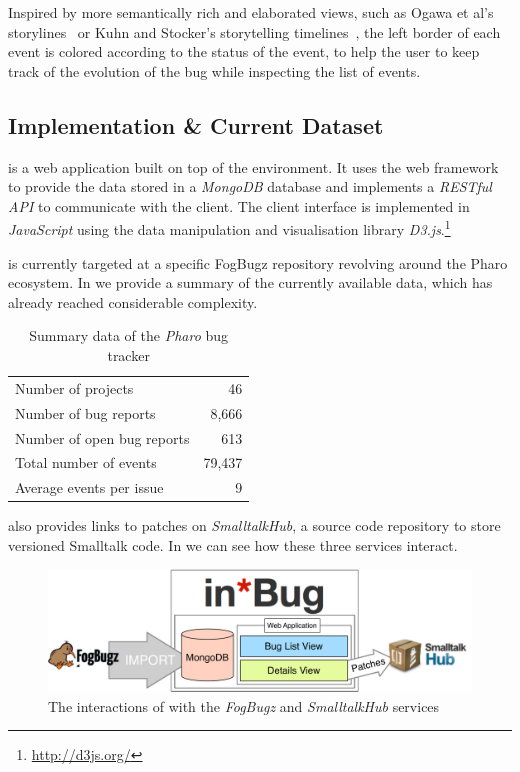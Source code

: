 \indent{}Inspired by more semantically rich and elaborated views, such as Ogawa et al's storylines~\cite{Ogaw2010a} or Kuhn and Stocker's storytelling timelines~\cite{Kuhn2012a}, the left border of each event is colored according to the status of the event, to help the user to keep track of the evolution of the bug while inspecting the list of events.

\subsection{Implementation \& Current Dataset}

\ib is a web application built on top of the \pha environment.
It uses the \sea web framework~\cite{Duca2010a} to provide the data stored in a \textit{MongoDB} database and implements a \textit{RESTful API} to communicate with the client.
The client interface is implemented in \textit{JavaScript} using the data manipulation and visualisation library \textit{D3.js}.\footnote{\url{http://d3js.org/}}

\ib is currently targeted at a specific FogBugz repository revolving around the Pharo ecosystem.
In  we provide a summary of the currently available data, which has already reached considerable complexity.

\begin{table}[ht]
\center
\caption{Summary data of the \textit{Pharo} bug tracker}
\label{tab-tracker-summary}
\begin{tabular}{p{7cm} r} \hline
Number of projects & 46 \\
Number of bug reports & 8,666 \\
Number of open bug reports & 613 \\
Total number of events & 79,437 \\
Average events per issue & 9 \\ \hline
\end{tabular}
\end{table}

\ib also provides links to patches on \emph{SmalltalkHub}, a source code repository to store versioned Smalltalk code.
In  we can see how these three services interact.

\begin{figure}[ht]
\includegraphics[width=\linewidth]{Images/visualize/inbug-ecosystem.pdf}
\caption{The interactions of \ib with the \emph{FogBugz} and \emph{SmalltalkHub} services}
\label{fig-inbug-ecosystem}
\end{figure}


